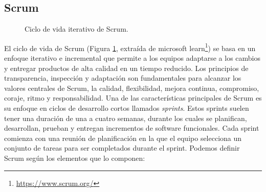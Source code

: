 \subsection{Scrum}

\begin{figure}[H]
    \caption{Ciclo de vida iterativo de Scrum.}
    \label{fig:scrum_ciclo_vida}
\end{figure}
El ciclo de vida de Scrum (Figura \ref{fig:scrum_ciclo_vida}, extraída de microsoft learn\footnote{\url{https://www.scrum.org/}}) se basa en un enfoque iterativo e incremental que permite a los equipos adaptarse a los cambios y entregar productos de alta calidad en un tiempo reducido. Los principios de transparencia, inspección y adaptación son fundamentales para alcanzar los valores centrales de Scrum, la calidad, flexibilidad, mejora continua, compromiso, coraje, ritmo y responsabilidad. 
Una de las características principales de Scrum es su enfoque en ciclos de desarrollo cortos llamados \emph{sprints}. Estos sprints suelen tener una duración de una a cuatro semanas, durante los cuales se planifican, desarrollan, prueban y entregan incrementos de software funcionales. Cada sprint comienza con una reunión de planificación en la que el equipo selecciona un conjunto de tareas para ser completados durante el sprint. Podemos definir Scrum según los elementos que lo componen:

